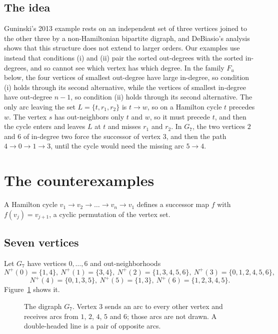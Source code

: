 \documentclass[11pt]{article}
\begin{document}
\subsection{The idea}
Guninski's 2013 example rests on an independent set of three vertices joined to the other three by a non-Hamiltonian bipartite digraph, and DeBiasio's analysis shows that this structure does not extend to larger orders. Our examples use instead that conditions (i) and (ii) pair the sorted out-degrees with the sorted in-degrees, and so cannot see which vertex has which degree. In the family $F_u$ below, the four vertices of smallest out-degree have large in-degree, so condition (i) holds through its second alternative, while the vertices of smallest in-degree have out-degree $n-1$, so condition (ii) holds through its second alternative. The only arc leaving the set $L=\{t,r_1,r_2\}$ is $t\to w$, so on a Hamilton cycle $t$ precedes $w$. The vertex $s$ has out-neighbors only $t$ and $w$, so it must precede $t$, and then the cycle enters and leaves $L$ at $t$ and misses $r_1$ and $r_2$. In $G_7$, the two vertices $2$ and $6$ of in-degree two force the successor of vertex $3$, and then the path $4\to0\to1\to3$, until the cycle would need the missing arc $5\to4$.

\section{The counterexamples}

A Hamilton cycle $v_1\to v_2\to\dots\to v_n\to v_1$ defines a successor map $f$ with $f(v_j)=v_{j+1}$, a cyclic permutation of the vertex set.

\subsection{Seven vertices}
Let $G_7$ have vertices $0,\dots,6$ and out-neighborhoods
\[
N^+(0)=\{1,4\},\ N^+(1)=\{3,4\},\ N^+(2)=\{1,3,4,5,6\},\ N^+(3)=\{0,1,2,4,5,6\},
\]
\[
N^+(4)=\{0,1,3,5\},\ N^+(5)=\{1,3\},\ N^+(6)=\{1,2,3,4,5\}.
\]
Figure~\ref{fig:G7} shows it.

\begin{figure}[ht]
\centering
{}
\caption{The digraph $G_7$. Vertex $3$ sends an arc to every other vertex and receives arcs from $1$, $2$, $4$, $5$ and $6$; those arcs are not drawn. A double-headed line is a pair of opposite arcs.}\label{fig:G7}
\end{figure}
\end{document}
